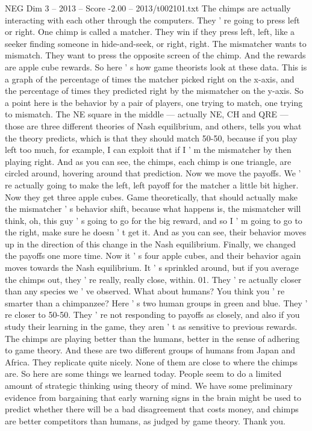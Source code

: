 \begin{textsample}{NEG Dim 3 – 2013 – Score -2.00 – 2013/t002101.txt}
The chimps are actually interacting with each other through the computers.
They ' re going to press left or right.
One chimp is called a matcher.
They win if they press left, left, like a seeker finding someone in hide-and-seek, or right, right.
The mismatcher wants to mismatch.
They want to press the opposite screen of the chimp.
And the rewards are apple cube rewards.
So here ' s how game theorists look at these data.
This is a graph of the percentage of times the matcher picked right on the x-axis, and the percentage of times they predicted right by the mismatcher on the y-axis.
So a point here is the behavior by a pair of players, one trying to match, one trying to mismatch.
The NE square in the middle — actually NE, CH and QRE — those are three different theories of Nash equilibrium, and others, tells you what the theory predicts, which is that they should match 50-50, because if you play left too much, for example, I can exploit that if I ' m the mismatcher by then playing right.
And as you can see, the chimps, each chimp is one triangle, are circled around, hovering around that prediction.
Now we move the payoffs.
We ' re actually going to make the left, left payoff for the matcher a little bit higher.
Now they get three apple cubes.
Game theoretically, that should actually make the mismatcher ' s behavior shift, because what happens is, the mismatcher will think, oh, this guy ' s going to go for the big reward, and so I ' m going to go to the right, make sure he doesn ' t get it.
And as you can see, their behavior moves up in the direction of this change in the Nash equilibrium.
Finally, we changed the payoffs one more time.
Now it ' s four apple cubes, and their behavior again moves towards the Nash equilibrium.
It ' s sprinkled around, but if you average the chimps out, they ' re really, really close, within. 01.
They ' re actually closer than any species we ' ve observed.
What about humans?
You think you ' re smarter than a chimpanzee?
Here ' s two human groups in green and blue.
They ' re closer to 50-50.
They ' re not responding to payoffs as closely, and also if you study their learning in the game, they aren ' t as sensitive to previous rewards.
The chimps are playing better than the humans, better in the sense of adhering to game theory.
And these are two different groups of humans from Japan and Africa.
They replicate quite nicely.
None of them are close to where the chimps are.
So here are some things we learned today.
People seem to do a limited amount of strategic thinking using theory of mind.
We have some preliminary evidence from bargaining that early warning signs in the brain might be used to predict whether there will be a bad disagreement that costs money, and chimps are better competitors than humans, as judged by game theory.
Thank you.

\end{textsample}
